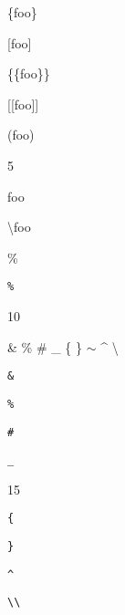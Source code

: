 
\def\mytitle{Special Characters}


\{foo\}

[foo]

\{\{foo\}\}

[[foo]]

(foo)

5

\textbar{}foo\textbar{}

\textbackslash{}foo

\%

\texttt{\%}

10

\& \% \# \_ \{ \} \ensuremath{\sim} \^{} \textbackslash{}

\texttt{\&}

\texttt{\%}

\texttt{\#}

\texttt{\_}

15

\texttt{\{}

\texttt{\}}

\texttt{\^{}}

\texttt{\textbackslash{}\textbackslash{}}



